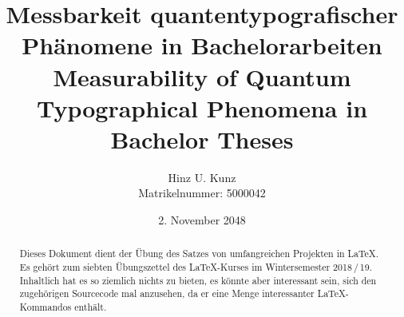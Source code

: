 \documentclass{scrreprt}
\begin{document}
\quad\thispagestyle{empty}\newpage
\titlehead{Ruprecht-Karls-Universität Heidelberg\\
Fakultät für Mathematik und Informatik\\
Institut für Informatik}
\subject{keine Bachelorarbeit}
\title{\Large
	Messbarkeit quantentypografischer Phänomene in Bachelorarbeiten\\
	Measurability of Quantum Typographical Phenomena in Bachelor Theses
}
\author{Hinz U. Kunz\\
\small Matrikelnummer: 5000042}
\publishers{nicht betreut durch Prof.\,Dr.\,max.\,mus. Termann}
\date{2. November 2048}
\extratitle{\centering Quantentypografie in Bachelorarbeiten}

\maketitle
\tableofcontents

\begin{abstract}
Dieses Dokument dient der Übung des Satzes von umfangreichen Projekten in \LaTeX{}. Es gehört zum siebten Übungszettel des \LaTeX-Kurses im Wintersemester 2018\,/\,19. Inhaltlich hat es so ziemlich nichts zu bieten, es könnte aber interessant sein, sich den zugehörigen Sourcecode mal anzusehen, da er eine Menge interessanter \LaTeX-Kommandos enthält.
\end{abstract}






\appendix
\listoffigures
\listoftables
\listoflistings
\end{document}

